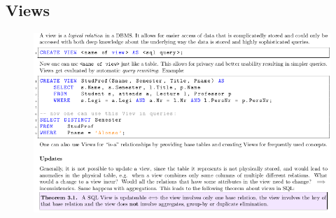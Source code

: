 \documentclass[11pt,oneside,a4paper]{article}
\begin{document}
\subsection{Views}

\vspace{-\topsep}
\begin{figure}[hb!]
	\centering
	\includegraphics[width=1\linewidth]{figures/sql_12}
	\label{fig:sql12}
\end{figure}
\vspace{-\topsep}

\titlespacing{\subsection}{0pt}{2ex}{2ex}



\label{lastpage} %
\clearpage
{}



\clearpage
\appendix
{}
\end{document}
